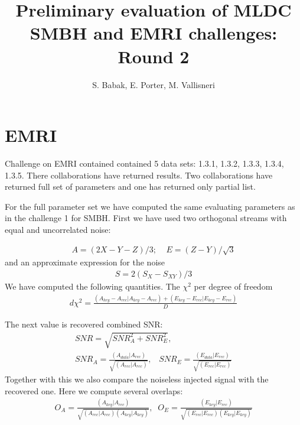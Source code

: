 \documentclass[prd,aps,amsfonts,amsmath, nofootinbib]{revtex4}
\def\bea{\begin{eqnarray}}
\def\ena{\end{eqnarray}}
\begin{document}
\title{Preliminary evaluation of MLDC SMBH and EMRI challenges: 
Round 2}
\author{S. Babak, E. Porter, M. Vallisneri}
\maketitle

\section{EMRI}

Challenge on EMRI contained contained 5 data sets: 1.3.1, 1.3.2, 1.3.3, 1.3.4, 1.3.5.
There collaborations have returned results. Two collaborations have returned full set of parameters and one has returned only partial list.

For the full parameter set we have computed the same evaluating
parameters as in the challenge 1 for SMBH.
First we have  used two orthogonal streams with equal and uncorrelated noise:

\bea
A = (2X - Y - Z)/3; \;\;\;\; E = (Z - Y)/\sqrt{3}
\ena
and an approximate expression for the noise 
\bea
S = 2(S_X - S_{XY})/3
\ena
We have computed the following quantities. The $\chi^2$ per degree
of freedom
\bea
d\chi^{2} = \frac{(A_{key}- A_{rec}|A_{key}- A_{rec}) +
(E_{key} - E_{rec}|E_{key} - E_{rec})}
{D}
\ena

The next value is recovered combined SNR:
\bea
SNR  = \sqrt{SNR_A^2 + SNR_E^2},\\
SNR_A = \frac{(A_{data}|A_{rec})}{\sqrt{(A_{rec}|A_{rec})}},\;\;\;
SNR_E= \frac{(E_{data}|E_{rec})}{\sqrt{(E_{rec}|E_{rec})}}
\ena
Together with this we also compare the noiseless injected signal with
the recovered one. Here we compute several overlaps:
\bea
O_A = \frac{(A_{key}|A_{rec})}{\sqrt{(A_{rec}|A_{rec})(A_{key}|A_{key})}}, \;\;
O_E = \frac{(E_{key}|E_{rec})}{\sqrt{(E_{rec}|E_{rec})(E_{key}|E_{key})}}
\ena
\end{document}
